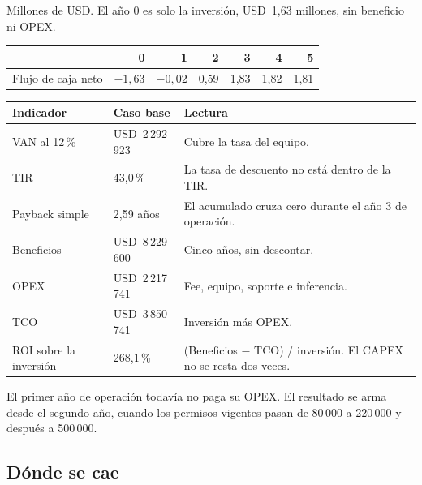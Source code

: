 \documentclass[11pt]{article}
\newcommand{\usd}[1]{USD~#1}
\begin{document}
\noindent Millones de USD. El año 0 es solo la inversión, \usd{1{,}63} millones, sin beneficio ni OPEX.

\begin{table}[ht]
\centering
\small
\begin{tabular}{lrrrrrr}
\toprule
 & \textbf{0} & \textbf{1} & \textbf{2} & \textbf{3} & \textbf{4} & \textbf{5} \\
\midrule
Flujo de caja neto & $-1{,}63$ & $-0{,}02$ & 0{,}59 & 1{,}83 & 1{,}82 & 1{,}81 \\
\bottomrule
\end{tabular}
\end{table}

\begin{table}[ht]
\centering
\small
\begin{tabularx}{\textwidth}{@{}l l X@{}}
\toprule
\textbf{Indicador} & \textbf{Caso base} & \textbf{Lectura} \\
\midrule
VAN al 12\,\% & \usd{2\,292\,923} & Cubre la tasa del equipo. \\
TIR & 43{,}0\,\% & La tasa de descuento no está dentro de la TIR. \\
Payback simple & 2{,}59 años & El acumulado cruza cero durante el año 3 de operación. \\
Beneficios & \usd{8\,229\,600} & Cinco años, sin descontar. \\
OPEX & \usd{2\,217\,741} & Fee, equipo, soporte e inferencia. \\
TCO & \usd{3\,850\,741} & Inversión más OPEX. \\
ROI sobre la inversión & 268{,}1\,\% & (Beneficios $-$ TCO) / inversión. El CAPEX no se resta dos veces. \\
\bottomrule
\end{tabularx}
\end{table}

El primer año de operación todavía no paga su OPEX. El resultado se arma desde el segundo año, cuando los permisos vigentes pasan de 80\,000 a 220\,000 y después a 500\,000.

\subsection{Dónde se cae}
\end{document}
